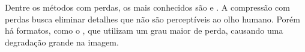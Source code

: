 Dentre os métodos com perdas, os mais conhecidos são \jpeg e \gif. A compressão com perdas busca eliminar detalhes que não são perceptíveis ao olho humano. Porém há formatos, como o \gif, que utilizam um grau maior de perda, causando uma degradação grande na imagem.

%
%
%
%
%
%
